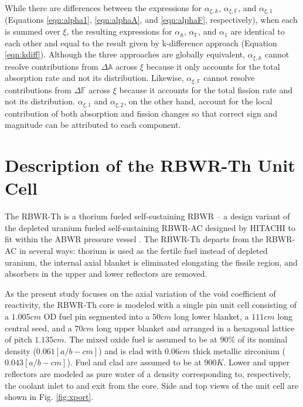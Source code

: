 \documentclass[11pt]{article}
\newcommand{\A}[0]{\mathbb{A}}
\newcommand{\F}[0]{\mathbb{F}}
\begin{document}
While there are differences between the expressions for $\alpha_{\xi,\A}$, $\alpha_{\xi,\F}$, and $\alpha_{\xi,1}$ (Equations \ref{eqn:alpha1}, \ref{eqn:alphaA}, and \ref{eqn:alphaF}, respectively), when each is summed over $\xi$, the resulting expressions for $\alpha_\A$, $\alpha_\F$, and $\alpha_1$ are identical to each other and equal to the result given by k-difference approach (Equation \ref{eqn:kdiff}).
Although the three approaches are globally equivalent, $\alpha_{\xi,\A}$ cannot resolve contributions from $\Delta\A$ across $\xi$ because it only accounts for the total absorption rate and not its distribution.
Likewise, $\alpha_{\xi,\F}$ cannot resolve contributions from $\Delta\F$ across $\xi$ because it accounts for the total fission rate and not its distribution.
$\alpha_{\xi,1}$ and $\alpha_{\xi,2}$, on the other hand, account for the local contribution of both absorption and fission changes so that correct sign and magnitude can be attributed to each component.

\section{Description of the RBWR-Th Unit Cell}
\label{sec:model}

The RBWR-Th \cite{ganda2012sst} is a thorium fueled self-sustaining RBWR -- a design variant of the depleted uranium fueled self-sustaining RBWR-AC designed by HITACHI to fit within the ABWR pressure vessel \cite{takeda2007blt}.
The RBWR-Th departs from the RBWR-AC in several ways: thorium is used as the fertile fuel instead of depleted uranium, the internal axial blanket is eliminated elongating the fissile region, and absorbers in the upper and lower reflectors are removed.

As the present study focuses on the axial variation of the void coefficient of reactivity, the RBWR-Th core is modeled with a single pin unit cell consisting of a $1.005cm$ OD fuel pin segmented into a $50cm$ long lower blanket, a $111cm$ long central seed, and a $70cm$ long upper blanket and arranged in a hexagonal lattice of pitch $1.135cm$.
The mixed oxide fuel is assumed to be at $90\%$ of its nominal density ($0.061[a/b-cm]$) and is clad with $0.06cm$ thick metallic zirconium ($0.043[a/b-cm]$).
Fuel and clad are assumed to be at $900K$.
Lower and upper reflectors are modeled as pure water of a density corresponding to, respectively, the coolant inlet to and exit from the core.
Side and top views of the unit cell are shown in Fig. \ref{fig:xport}.
\end{document}
